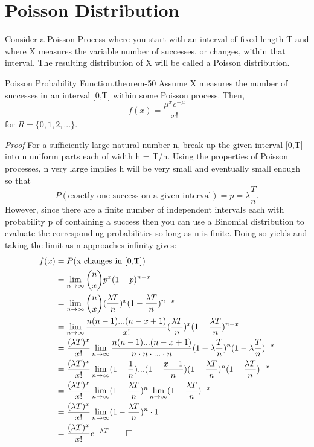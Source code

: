 \documentclass[10pt,]{book}
\makeatletter
\renewcommand*{\proofname}{Proof}
\renewenvironment{proof}[1][\proofname]{\par
  \pushQED{\qed}%
  \normalfont \topsep6\p@\@plus6\p@\relax
  \trivlist
  \item\relax
    {\itshape
    #1\@addpunct{.}}\hspace\labelsep\ignorespaces
}{%
  \popQED\endtrivlist\@endpefalse
}
\numberwithin{equation}{section}
\makeatother
\begin{document}
\section[{Poisson Distribution}]{Poisson Distribution}\label{section-52}
\hypertarget{p-1027}{}%
Consider a Poisson Process where you start with an interval of fixed length T and where X measures the variable number of successes, or changes, within that interval. The resulting distribution of X will be called a Poisson distribution.%
\par
\hypertarget{p-1028}{}%
\begin{theorem}{Poisson Probability Function.}{}{theorem-50}%
\hypertarget{p-1029}{}%
Assume X measures the number of successes in an interval [0,T] within some Poisson process. Then,%
\begin{equation*}
f(x) = \frac{\mu^x e^{-\mu}}{x!}
\end{equation*}
for \(R = \{ 0, 1, 2, ... \}\).%
\end{theorem}
\begin{proof}\hypertarget{proof-52}{}
\hypertarget{p-1030}{}%
For a sufficiently large natural number n, break up the given interval [0,T] into n uniform parts each of width h = T/n.  Using the properties of Poisson processes, n very large implies h will be very small and eventually small enough so that%
\begin{equation*}
P(\text{exactly one success on a given interval}) = p = \lambda \frac{T}{n}.
\end{equation*}
However, since there are a finite number of independent intervals each with probability p of containing a success then you can use a Binomial distribution to evaluate the corresponding probabilities so long as n is finite. Doing so yields and taking the limit as n approaches infinity gives:%
\begin{align*}
f(x) & = P(\text{x changes in [0,T]}) \\
& = \lim_{n \rightarrow \infty} \binom{n}{x} p^x (1-p)^{n-x}\\
& = \lim_{n \rightarrow \infty} \binom{n}{x} (\frac{\lambda T}{n})^x (1-\frac{\lambda T}{n})^{n-x}\\
& = \lim_{n \rightarrow \infty} \frac{n(n-1)...(n-x+1)}{x!} ( \frac{\lambda T}{n})^x (1- \frac{\lambda T}{n})^{n-x}\\
& = \frac{(\lambda T)^x}{x!} \lim_{n \rightarrow \infty} \frac{n(n-1)...(n-x+1)}{n \cdot n \cdot ... \cdot n} (1-\lambda \frac{T}{n})^{n}(1-\lambda \frac{T}{n})^{-x}\\
& = \frac{(\lambda T)^x}{x!} \lim_{n \rightarrow \infty} (1-\frac{1}{n})...(1-\frac{x-1}{n})  (1- \frac{\lambda T}{n})^{n}(1- \frac{\lambda T}{n})^{-x}\\
& = \frac{(\lambda T)^x}{x!} 
\lim_{n \rightarrow \infty} (1- \frac{\lambda T}{n})^{n}
\lim_{n \rightarrow \infty} (1- \frac{\lambda T}{n})^{-x}\\
& = \frac{(\lambda T)^x}{x!} 
\lim_{n \rightarrow \infty} (1- \frac{\lambda T}{n})^{n} \cdot 1\\
& = \frac{(\lambda T)^x}{x!} 
e^{-\lambda T}\qedhere
\end{align*}
%
\end{proof}
\end{document}
